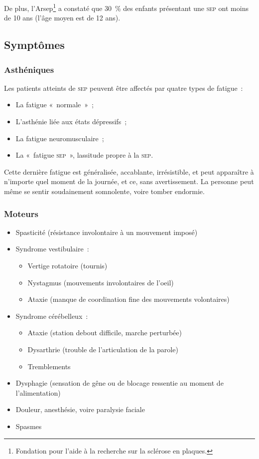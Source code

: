 \documentclass[a4paper,12pt,francais]{article}
\newcommand{\SEP}{\textsc{sep}\xspace}
\begin{document}
De plus, l’Arsep\footnote{Fondation pour l'aide à la recherche sur la sclérose en plaques.} a constaté que 30~\% des enfants présentant une \SEP{} ont moins de 10 ans (l’âge moyen est de 12 ans).

\subsection{Symptômes}

\subsubsection{Asthéniques}
Les patients atteints de \SEP{} peuvent être affectés par quatre types de fatigue~:
\begin{itemize}
    \item La fatigue «~normale~»~;
    \item L’asthénie liée aux états dépressifs~;
    \item La fatigue neuromusculaire~;
    \item La «~fatigue \SEP{}~», lassitude propre à la \SEP{}.
\end{itemize}

Cette dernière fatigue est généralisée, accablante, irrésistible, et peut apparaître à n’importe quel moment de la journée, et ce, sans avertissement. La personne peut même se sentir soudainement somnolente, voire tomber endormie.

\subsubsection{Moteurs}
\begin{itemize}
    \item Spasticité (résistance involontaire à un mouvement imposé)
    \item Syndrome vestibulaire~:
        \begin{itemize}
            \item Vertige rotatoire (tournis)
            \item Nystagmus (mouvements involontaires de l'oeil)
            \item Ataxie (manque de coordination fine des mouvements volontaires)
        \end{itemize}
    \item Syndrome cérébelleux~:
        \begin{itemize}
            \item Ataxie (station debout difficile, marche perturbée)
            \item Dysarthrie (trouble de l'articulation de la parole)
            \item Tremblements
        \end{itemize}
    \item Dysphagie (sensation de gêne ou de blocage ressentie au moment de l'alimentation)
    \item Douleur, anesthésie, voire paralysie faciale
    \item Spasmes
\end{itemize}
\end{document}
